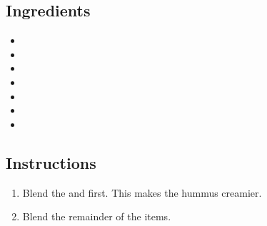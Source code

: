 \documentclass[12pt]{article}
\begin{document}
\recipetitle

\subsection*{Ingredients}

\begin{itemize}[nolistsep]
    \item {}
    \item {}
    \item {}
    \item {}
    \item {}
    \item {}
    \item {}
\end{itemize}

\subsection*{Instructions}

\begin{enumerate}
    \item Blend the  and  first. This makes the hummus creamier.
    \item Blend the remainder of the items.
\end{enumerate}
\end{document}
